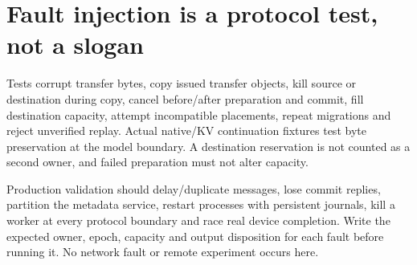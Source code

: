 \section{Fault injection is a protocol test, not a slogan}
\label{evod46:tests}
Tests corrupt transfer bytes, copy issued transfer objects, kill source or
destination during copy, cancel before/after preparation and commit, fill
destination capacity, attempt incompatible placements, repeat migrations and
reject unverified replay. Actual native/KV continuation fixtures test byte
preservation at the model boundary. A destination reservation is not counted
as a second owner, and failed preparation must not alter capacity.

Production validation should delay/duplicate messages, lose commit replies,
partition the metadata service, restart processes with persistent journals,
kill a worker at every protocol boundary and race real device completion.
Write the expected owner, epoch, capacity and output disposition for each
fault before running it. No network fault or remote experiment occurs here.

